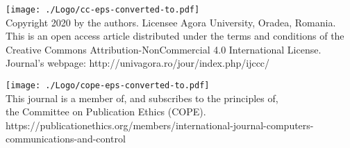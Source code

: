 \documentclass[11pt,a4paper]{article}
\begin{document}
\begin{figure*}[h!]
\texttt{[image: ./Logo/cc-eps-converted-to.pdf]}\\
Copyright 2020 by the authors. Licensee Agora University, Oradea, Romania.\\
 This is an open access article distributed under the terms and conditions of the Creative Commons Attribution-NonCommercial 4.0 International License.\\
Journal's webpage: http://univagora.ro/jour/index.php/ijccc/ \\
\end{figure*}
\begin{figure*}[h!]
\centering
\texttt{[image: ./Logo/cope-eps-converted-to.pdf]}\\
This journal is a member of, and subscribes to the principles of,\\
 the Committee on Publication Ethics (COPE).\\
 https://publicationethics.org/members/international-journal-computers-communications-and-control
\end{figure*}

\label{LastPage}
\end{document}
